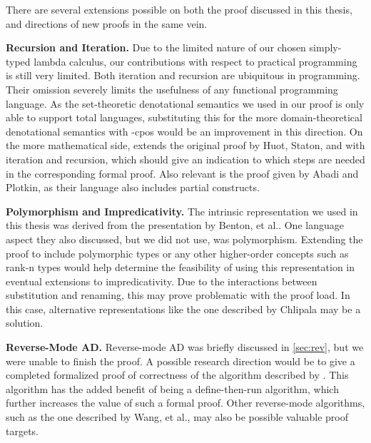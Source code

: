 There are several extensions possible on both the proof discussed in this thesis, and directions of new proofs in the same vein.

\textbf{Recursion and Iteration.} Due to the limited nature of our chosen simply-typed lambda calculus, our contributions with respect to practical programming is still very limited.
Both iteration and recursion are ubiquitous in programming.
Their omission severely limits the usefulness of any functional programming language.
As the set-theoretic denotational semantics we used in our proof is only able to support total languages, substituting this for the more domain-theoretical denotational semantics with \omega-cpos would be an improvement in this direction.
On the more mathematical side, \Vakar{}\cite{vkr2020denotational} extends the original proof by Huot, Staton, and \Vakar{}\cite{huot2020correctness} with iteration and recursion, which should give an indication to which steps are needed in the corresponding formal proof.
Also relevant is the proof given by Abadi and Plotkin\cite{10.1145/3371106}, as their language also includes partial constructs.

\textbf{Polymorphism and Impredicativity.} The intrinsic representation we used in this thesis was derived from the presentation by Benton, et al.\cite{Benton2011}.
One language aspect they also discussed, but we did not use, was polymorphism.
Extending the proof to include polymorphic types or any other higher-order concepts such as rank-n types would help determine the feasibility of using this representation in eventual extensions to impredicativity.
Due to the interactions between substitution and renaming, this may prove problematic with the proof load.
In this case, alternative representations like the one described by Chlipala\cite{10.1145/1411203.1411226} may be a solution.

\textbf{Reverse-Mode AD.} Reverse-mode AD was briefly discussed in \cref{sec:rev}, but we were unable to finish the proof.
A possible research direction would be to give a completed formalized proof of correctness of the algorithm described by \Vakar{}\cite{vkr2020reverse}.
This algorithm has the added benefit of being a define-then-run algorithm, which further increases the value of such a formal proof.
Other reverse-mode algorithms, such as the one described by Wang, et al.\cite{ShiftReset:Backprop}, may also be possible valuable proof targets.
